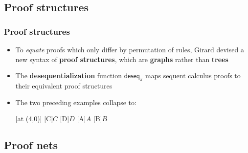 \documentclass[usenames,dvipsnames]{beamer}
\begin{document}
\subsection{Proof structures}

\begin{frame}
    \frametitle{Proof structures}
    \begin{itemize}
        \setlength\itemsep{1em}
        \item To \emph{equate} proofs which only differ by permutation of rules, Girard devised a
        new syntax of \textbf{proof structures}, which are \textbf{graphs} rather than
        \textbf{trees}
        \item The \textbf{desequentialization} function $\mathsf{deseq}_π$ maps sequent calculus
        proofs to their equivalent proof structures
        \item The two preceding examples collapse to:
        \vspace{1em}
        \begin{proofnet}
            [at (4,0)]
            [C]{$C$}
            [D]{$D$}
            [A]{$A$}
            [B]{$B$}
        \end{proofnet}
    \end{itemize}
\end{frame}

\subsection{Proof nets}

\end{document}
